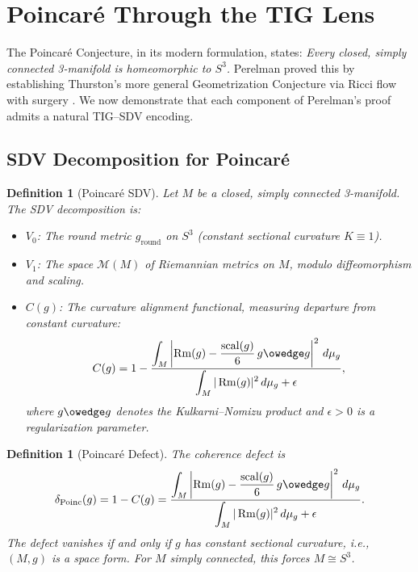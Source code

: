 \documentclass[11pt]{article}
\newtheorem{definition}[theorem]{Definition}
\DeclareMathOperator{\Rm}{Rm}
\DeclareMathOperator{\scal}{scal}
\begin{document}
\section{Poincar\'e Through the TIG Lens}
\label{sec:poincare}

The Poincar\'e Conjecture, in its modern formulation, states:
\emph{Every closed, simply connected 3-manifold is homeomorphic to
$S^3$.}  Perelman proved this by establishing Thurston's more general
Geometrization Conjecture via Ricci flow with surgery
\cite{Per1,Per2,Per3}.  We now demonstrate that each component of
Perelman's proof admits a natural TIG--SDV encoding.

\subsection{SDV Decomposition for Poincar\'e}
\label{subsec:poinc-sdv}

\begin{definition}[Poincar\'e SDV]
\label{def:poinc-sdv}
Let $M$ be a closed, simply connected 3-manifold.  The SDV
decomposition is:
\begin{itemize}
\item $V_0$: The round metric $g_{\mathrm{round}}$ on $S^3$
(constant sectional curvature $K \equiv 1$).
\item $V_1$: The space $\mathcal{M}(M)$ of Riemannian metrics on $M$,
modulo diffeomorphism and scaling.
\item $C(g)$: The curvature alignment functional, measuring departure
from constant curvature:
\[
C(g) = 1 - \frac{\displaystyle\int_M \left|\Rm(g)
    - \frac{\scal(g)}{6}\, g \owedge g\right|^2 \, d\mu_g}
{\displaystyle\int_M |\Rm(g)|^2 \, d\mu_g + \epsilon},
\]
where $g \owedge g$ denotes the Kulkarni--Nomizu product and
$\epsilon > 0$ is a regularization parameter.
\end{itemize}
\end{definition}

\begin{definition}[Poincar\'e Defect]
\label{def:poinc-defect}
The coherence defect is
\[
\delta_{\mathrm{Poinc}}(g) = 1 - C(g)
= \frac{\displaystyle\int_M \left|\Rm(g)
    - \frac{\scal(g)}{6}\, g \owedge g\right|^2 \, d\mu_g}
{\displaystyle\int_M |\Rm(g)|^2 \, d\mu_g + \epsilon}.
\]
The defect vanishes if and only if $g$ has constant sectional curvature,
i.e., $(M, g)$ is a space form.  For $M$ simply connected, this forces
$M \cong S^3$.
\end{definition}
\end{document}
